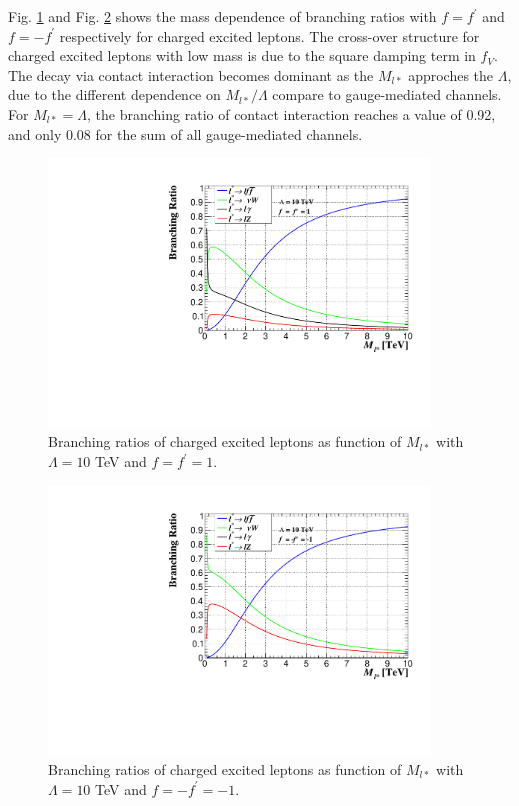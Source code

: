 Fig. \ref{fig:BR_ExLep} and Fig. \ref{fig:BR_ExLep_n1} shows the mass dependence of branching ratios with $f = f^{\prime}$ and $f = -f^{\prime}$ respectively for charged excited leptons. The cross-over structure for charged excited leptons with low mass is due to the square damping term in $f_{V}$. The decay via contact interaction becomes dominant as the $M_{l*}$ approches the $\Lambda$, due to the different dependence on $M_{l*} / \Lambda$ compare to gauge-mediated channels. For $M_{l*} = \Lambda$, the branching ratio of contact interaction reaches a value of 0.92, and only 0.08 for the sum of all gauge-mediated channels.  

\begin{figure}[h!]
\begin{center}
\includegraphics[width=0.9\textwidth]{plot/BR1.pdf}  
\caption{\label{fig:BR_ExLep}Branching ratios of charged excited leptons as function of $M_{l*}$ with $\Lambda = 10$ TeV and $f = f^{\prime} = 1$.}
\end{center}
\end{figure}

\begin{figure}[h!]
\begin{center}
\includegraphics[width=0.9\textwidth]{plot/BRn1.pdf}  
\caption{\label{fig:BR_ExLep_n1}Branching ratios of charged excited leptons as function of $M_{l*}$ with $\Lambda = 10$ TeV and $f = -f^{\prime} = -1$.}
\end{center}
\end{figure}


